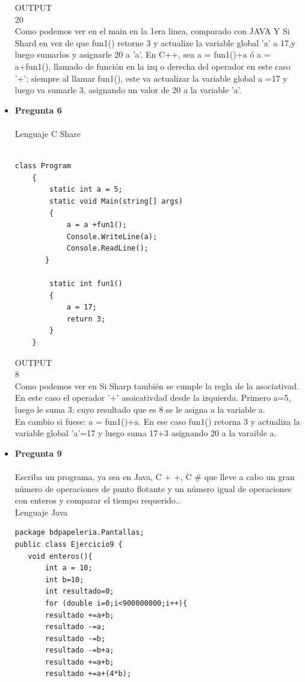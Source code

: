 \documentclass[12pt,oneside]{article}
\begin{document}
\begin{itemize}
OUTPUT\\
20\\
Como podemos ver en el main en la 1era linea, comparado con JAVA Y Si Shard en vez de que fun1() retorne 3 y actualize la variable global 'a' a 17,y luego sumarlos y asignarle 20 a 'a'. En C++, sea a = fun1()+a  ó  a = a+fun1(), llamado de función en la izq o derecha del operador en este caso '+'; siempre al llamar fun1(), este va actualizar la variable global a =17 y luego va sumarle 3, asignando un valor de 20 a  la variable 'a'. 


\item {\bf Pregunta 6} \\\\
Lenguaje C Share\\
\begin{lstlisting}[frame=single]  % Start your code-block

class Program
    {
        static int a = 5;
        static void Main(string[] args)
        {
            a = a +fun1();
            Console.WriteLine(a);
            Console.ReadLine();
       }

        static int fun1()
        {
            a = 17;
            return 3;
        }
    }
\end{lstlisting}
OUTPUT\\
8\\ 
Como podemos ver en Si Sharp también se cumple la regla de la asociativad. En este caso el operador '+' asoicativdad desde la izquierda. Primero a=5, luego le suma 3; cuyo resultado que es 8 se le asigna a la variable a.\\
En cambio si fuese:  a = fun1()+a. En ese caso fun1() retorna 3 y actualiza la variable global 'a'=17 y luego suma 17+3 asignando 20 a la varaible a.




\item {\bf Pregunta 9} \\\\
Escriba un programa, ya sea en Java, C + +, C \#  que lleve a cabo un gran número 
de operaciones de punto flotante y un número igual de operaciones con enteros 
y comparar el tiempo requerido..\\


Lenguaje Java\\
\begin{lstlisting}[frame=single]  % Start your code-block
package bdpapeleria.Pantallas;
public class Ejercicio9 {
   void enteros(){
       int a = 10;
       int b=10;
       int resultado=0;
       for (double i=0;i<900000000;i++){
       resultado +=a+b;
       resultado -=a;
       resultado -=b;
       resultado -=b+a;
       resultado +=a+b;
       resultado +=a+(4*b);
       

\end{lstlisting}
\end{itemize}
\end{document}
